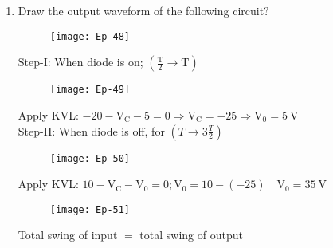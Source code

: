 \begin{enumerate}
	\item Draw the output waveform of the following circuit?
	\begin{figure}[H]
		\centering
		\texttt{[image: Ep-48]}
	\end{figure}
	\begin{answer}
		Step-I: When diode is on; $\left(\frac{\mathrm{T}}{2} \rightarrow \mathrm{T}\right)$
			\begin{figure}[H]
			\centering
			\texttt{[image: Ep-49]}
		\end{figure}
	Apply KVL: $-20-\mathrm{V}_{\mathrm{C}}-5=0 \Rightarrow \mathrm{V}_{\mathrm{C}}=-25 \Rightarrow \mathrm{V}_{0}=5 \mathrm{~V}$\\
	Step-II: When diode is off, for $\left(T \rightarrow 3 \frac{T}{2}\right)$
		\begin{figure}[H]
		\centering
		\texttt{[image: Ep-50]}
	\end{figure}
Apply KVL: $10-\mathrm{V}_{\mathrm{C}}-\mathrm{V}_{0}=0 ; \mathrm{V}_{0}=10-(-25) \quad \mathrm{V}_{0}=35 \mathrm{~V}$
	\begin{figure}[H]
	\centering
	\texttt{[image: Ep-51]}
\end{figure}
Total swing of input $=$ total swing of output
	\end{answer}
	
	
	
	
	
	
	
	
	
	
	
	
	
	
	
	
	
	
\end{enumerate}